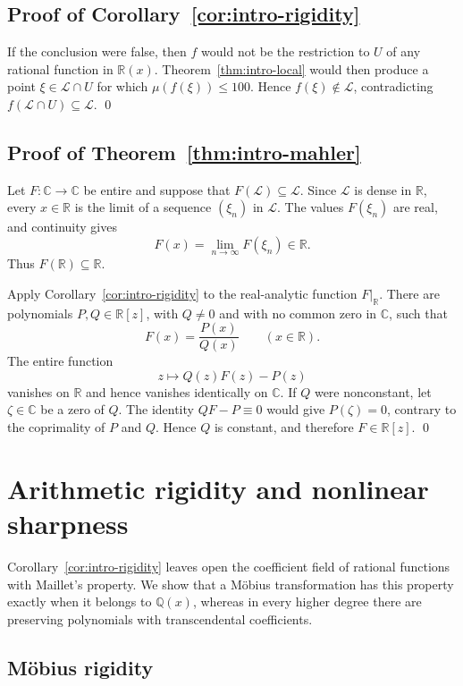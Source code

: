 \documentclass[11pt]{amsart}
\numberwithin{equation}{section}
\theoremstyle{definition}
\theoremstyle{remark}
\newcommand{\R}{\mathbb R}
\newcommand{\C}{\mathbb C}
\newcommand{\Lio}{\mathscr L}
\begin{document}
\subsection{Proof of Corollary~\ref{cor:intro-rigidity}}


If the conclusion were false, then $f$ would not be the restriction to
$U$ of any rational function in $\R(x)$. Theorem~\ref{thm:intro-local}
would then produce a point $\xi\in\Lio\cap U$ for which
$\mu(f(\xi))\leq100$. Hence $f(\xi)\notin\Lio$, contradicting
$f(\Lio\cap U)\subseteq\Lio$.
\qed


\subsection{Proof of Theorem~\ref{thm:intro-mahler}}


Let $F:\C\to\C$ be entire and suppose that
$F(\Lio)\subseteq\Lio$. Since $\Lio$ is dense in $\R$, every
$x\in\R$ is the limit of a sequence $(\xi_n)$ in $\Lio$. The values
$F(\xi_n)$ are real, and continuity gives
\[
F(x)=\lim_{n\to\infty}F(\xi_n)\in\R.
\]
Thus $F(\R)\subseteq\R$.

Apply Corollary~\ref{cor:intro-rigidity} to the real-analytic function
$F|_{\R}$. There are polynomials $P,Q\in\R[z]$, with $Q\neq0$ and with no
common zero in $\C$, such that
\[
F(x)=\frac{P(x)}{Q(x)}
\qquad(x\in\R).
\]
The entire function
\[
z\longmapsto Q(z)F(z)-P(z)
\]
vanishes on $\R$ and hence vanishes identically on $\C$. If $Q$ were
nonconstant, let $\zeta\in\C$ be a zero of $Q$. The identity
$QF-P\equiv0$ would give $P(\zeta)=0$, contrary to the coprimality of
$P$ and $Q$. Hence $Q$ is constant, and therefore $F\in\R[z]$.
\qed

\section{Arithmetic rigidity and nonlinear sharpness}
\label{sec:arithmetic-boundary}

Corollary~\ref{cor:intro-rigidity} leaves open the coefficient
field of rational functions with Maillet's property. We show
that a M\"obius transformation has this property exactly when
it belongs to $\mathbb Q(x)$, whereas in every higher degree
there are preserving polynomials with transcendental
coefficients.

\subsection{M\"obius rigidity}
\label{subsec:mobius-rigidity}
\end{document}
